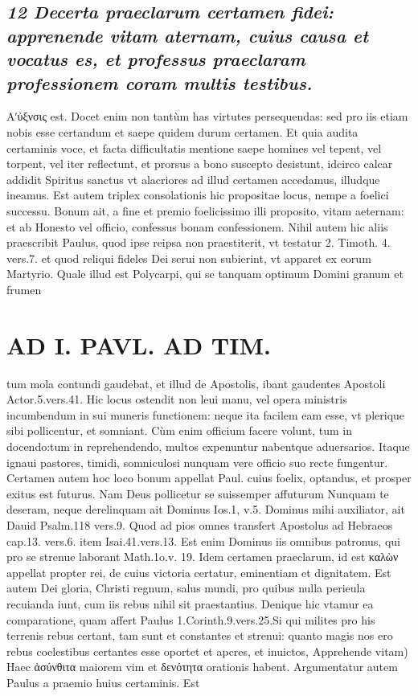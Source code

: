 \documentclass{article}
\begin{document}
\begin{pages}
\subsection*{\textit{12 Decerta praeclarum certamen fidei: apprenende vitam aternam, cuius causa et vocatus es, et professus praeclaram professionem coram multis testibus. }}\pstart Αʹὐξνσις est. Docet enim non tantùm has virtutes persequendas: sed pro iis etiam nobis esse certandum et saepe quidem durum certamen. Et quia audita certaminis voce, et facta difficultatis mentione saepe homines vel tepent, vel torpent, vel iter reflectunt, et prorsus a bono suscepto desistunt, idcirco calcar addidit Spiritus sanctus vt alacriores ad illud certamen accedamus, illudque ineamus. Est autem triplex consolationis hic propositae locus, nempe a foelici successu. Bonum ait, a fine et premio foelicissimo illi proposito, vitam aeternam: et ab Honesto vel officio, confessus bonam confessionem. Nihil autem hic aliis praescribit Paulus, quod ipse reipsa non praestiterit, vt testatur 2. Timoth. 4. vers.7. et quod reliqui fideles Dei serui non subierint, vt apparet ex eorum Martyrio. Quale illud est Polycarpi, qui se tanquam optimum Domini granum et frumen\pend
\section*{AD I. PAVL. AD TIM. }
\marginpar{[ p.114  ]}\pstart tum mola contundi gaudebat, et illud de Apostolis, ibant gaudentes Apostoli Actor.5.vers.41. Hic locus ostendit non leui manu, vel opera ministris incumbendum in sui muneris functionem: neque ita facilem eam esse, vt plerique sibi pollicentur, et somniant. Cùm enim officium facere volunt, tum in docendo:tum in reprehendendo, multos expenuntur nabentque aduersarios. Itaque ignaui pastores, timidi, somniculosi nunquam vere officio suo recte fungentur.  \pend\pstart Certamen autem hoc loco bonum appellat Paul. cuius foelix, optandus, et prosper exitus est futurus. Nam Deus pollicetur se suissemper affuturum Nunquam te deseram, neque derelinquam ait Dominus Ios.1, v.5. Dominus mihi auxiliator, ait Dauid Psalm.118 vers.9. Quod ad pios omnes transfert Apostolus ad Hebraeos cap.13. vers.6. item Isai.41.vers.13. Est enim Dominus iis omnibus patronus, qui pro se strenue laborant Math.1o.v. 19. Idem certamen praeclarum, id est καλὼν appellat propter rei, de cuius victoria certatur, eminentiam et dignitatem. Est autem Dei gloria, Christi regnum, salus mundi, pro quibus nulla perieula recuianda iunt, cum iis rebus nihil sit praestantius. Denique hic vtamur ea comparatione, quam affert Paulus 1.Corinth.9.vers.25.Si qui milites pro his terrenis rebus certant, tam sunt et constantes et strenui: quanto magis nos ero rebus coelestibus certantes esse oportet et apcres, et inuictos,  \pend\pstart Apprehende vitam) Haec ἀσύνθιτα maiorem vim et δενότητα orationis habent. Argumentatur autem Paulus a praemio huius certaminis. Est  \pend

\end{pages}
\end{document}
